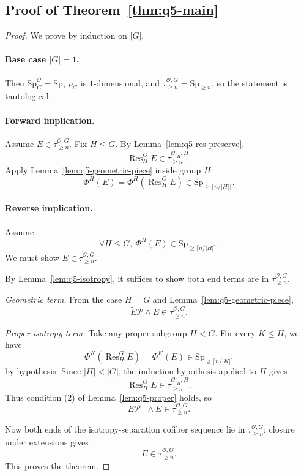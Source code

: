 \subsection*{Proof of Theorem~\ref{thm:q5-main}}

\begin{proof}
We prove by induction on $|G|$.

\paragraph{Base case $|G|=1$.}
Then $\mathrm{Sp}^{\mathcal O}_G=\mathrm{Sp}$, $\rho_G$ is $1$-dimensional, and $\tau^{\mathcal O,G}_{\ge n}=\mathrm{Sp}_{\ge n}$, so the statement is tautological.

\paragraph{Forward implication.}
Assume $E\in\tau^{\mathcal O,G}_{\ge n}$.
Fix $H\le G$. By Lemma~\ref{lem:q5-res-preserve},
\[
\operatorname{Res}^G_H E\in \tau^{\mathcal O|_H,H}_{\ge n}.
\]
Apply Lemma~\ref{lem:q5-geometric-piece} inside group $H$:
\[
\Phi^H(E)=\Phi^H(\operatorname{Res}^G_H E)\in \mathrm{Sp}_{\ge \lceil n/|H|\rceil}.
\]

\paragraph{Reverse implication.}
Assume
\[
\forall H\le G,\ \Phi^H(E)\in\mathrm{Sp}_{\ge \lceil n/|H|\rceil}.
\]
We must show $E\in\tau^{\mathcal O,G}_{\ge n}$.

By Lemma~\ref{lem:q5-isotropy}, it suffices to show both end terms are in $\tau^{\mathcal O,G}_{\ge n}$.

\emph{Geometric term.}
From the case $H=G$ and Lemma~\ref{lem:q5-geometric-piece},
\[
\widetilde E\mathcal P\wedge E\in\tau^{\mathcal O,G}_{\ge n}.
\]

\emph{Proper-isotropy term.}
Take any proper subgroup $H<G$.
For every $K\le H$, we have
\[
\Phi^K(\operatorname{Res}^G_H E)=\Phi^K(E)\in\mathrm{Sp}_{\ge \lceil n/|K|\rceil}
\]
by hypothesis.
Since $|H|<|G|$, the induction hypothesis applied to $H$ gives
\[
\operatorname{Res}^G_H E\in\tau^{\mathcal O|_H,H}_{\ge n}.
\]
Thus condition (2) of Lemma~\ref{lem:q5-proper} holds, so
\[
E\mathcal P_+\wedge E\in\tau^{\mathcal O,G}_{\ge n}.
\]

Now both ends of the isotropy-separation cofiber sequence lie in $\tau^{\mathcal O,G}_{\ge n}$; closure under extensions gives
\[
E\in\tau^{\mathcal O,G}_{\ge n}.
\]
This proves the theorem.
\end{proof}

